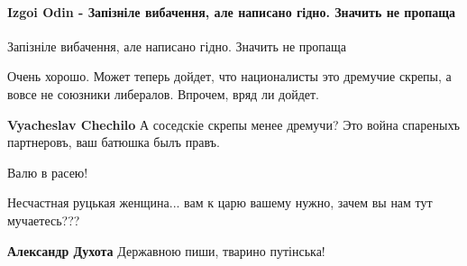 
 
 
 
 
\paragraph{Izgoi Odin - Запізніле вибачення, але написано гідно. Значить не пропаща}

\begin{itemize}

Запізніле вибачення, але написано гідно. Значить не пропаща


Очень хорошо. Может теперь дойдет, что националисты это дремучие скрепы, а
вовсе не союзники либералов. Впрочем, вряд ли дойдет.

\begin{itemize}

\textbf{Vyacheslav Chechilo} А соседскіе скрепы менее дремучи? Это война спареныхъ партнеровъ, ваш батюшка былъ правъ.
\end{itemize}


Валю в расею!


Несчастная руцькая женщина... вам к царю вашему нужно, зачем вы нам тут
мучаетесь???

\begin{itemize}

\textbf{Александр Духота} Державною пиши, тварино путінська!


\end{itemize}
\end{itemize}
